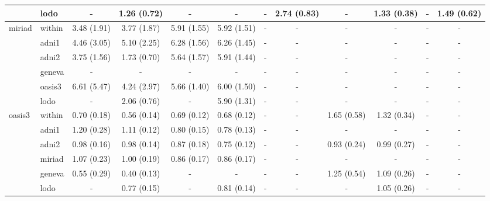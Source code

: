 \begin{table*}
{\begin{tabular}{llcccccccccc}
       & lodo &            - &  1.26 (0.72) &            - &            - &            - &  2.74 (0.83) &            - &  1.33 (0.38) &            - &  1.49 (0.62) \\
\midrule
miriad & within &  3.48 (1.91) &  3.77 (1.87) &  5.91 (1.55) &  5.92 (1.51) &            - &            - &            - &            - &            - &            - \\
\cmidrule(lr){2-12}
       & adni1 &  4.46 (3.05) &  5.10 (2.25) &  6.28 (1.56) &  6.26 (1.45) &            - &            - &            - &            - &            - &            - \\
       & adni2 &  3.75 (1.56) &  1.73 (0.70) &  5.64 (1.57) &  5.91 (1.44) &            - &            - &            - &            - &            - &            - \\
       & geneva &            - &            - &            - &            - &            - &            - &            - &            - &            - &            - \\
       & oasis3 &  6.61 (5.47) &  4.24 (2.97) &  5.66 (1.40) &  6.00 (1.50) &            - &            - &            - &            - &            - &            - \\
\cmidrule(lr){2-12}
       & lodo &            - &  2.06 (0.76) &            - &  5.90 (1.31) &            - &            - &            - &            - &            - &            - \\
\midrule
oasis3 & within &  0.70 (0.18) &  0.56 (0.14) &  0.69 (0.12) &  0.68 (0.12) &            - &            - &  1.65 (0.58) &  1.32 (0.34) &            - &            - \\
\cmidrule(lr){2-12}
       & adni1 &  1.20 (0.28) &  1.11 (0.12) &  0.80 (0.15) &  0.78 (0.13) &            - &            - &            - &            - &            - &            - \\
       & adni2 &  0.98 (0.16) &  0.98 (0.14) &  0.87 (0.18) &  0.75 (0.12) &            - &            - &  0.93 (0.24) &  0.99 (0.27) &            - &            - \\
       & miriad &  1.07 (0.23) &  1.00 (0.19) &  0.86 (0.17) &  0.86 (0.17) &            - &            - &            - &            - &            - &            - \\
       & geneva &  0.55 (0.29) &  0.40 (0.13) &            - &            - &            - &            - &  1.25 (0.54) &  1.09 (0.26) &            - &            - \\
\cmidrule(lr){2-12}
       & lodo &            - &  0.77 (0.15) &            - &  0.81 (0.14) &            - &            - &            - &  1.05 (0.26) &            - &            - \\
\bottomrule
\end{tabular}}
\end{table*}
